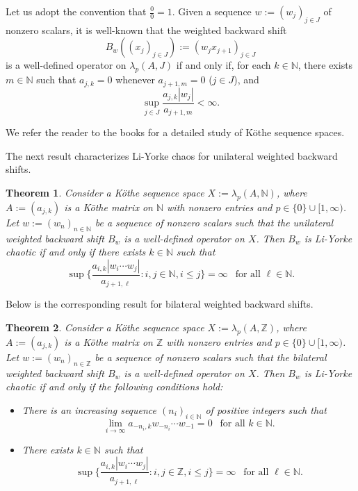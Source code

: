 \documentclass[12pt]{amsart}
\theoremstyle{theorem}
\newtheorem{theorem}{Theorem}%
\theoremstyle{definition}
\theoremstyle{remark} \theoremstyle{question} \theoremstyle{example}
\newcommand{\N}{\mathbb{N}}
\newcommand{\Z}{\mathbb{Z}}
\begin{document}
Let us adopt the convention that $\frac{0}{0} = 1$.
Given a sequence $w\!:= (w_j)_{j \in J}$ of nonzero scalars, it is well-known that the weighted backward shift
\[
B_w((x_j)_{j \in J})\!:= (w_j x_{j+1})_{j \in J}
\]
is a well-defined operator on $\lambda_p(A,J)$ if and only if, for each $k \in \N$, there exists $m \in \N$ such that
$a_{j,k} = 0$ whenever $a_{j+1,m} = 0$ ($j \in J$), and  
\begin{equation}\label{Kothe-Eq1}
\sup_{j \in J} \frac{a_{j,k} |w_j|}{a_{j+1,m}} < \infty.
\end{equation}

We refer the reader to the books \cite{GKot69,RMeiDVog97} for a detailed study of K\"othe sequence spaces.

The next result characterizes Li-Yorke chaos for unilateral weighted backward shifts.

\begin{theorem}\label{Kothe-LY-T1}
Consider a K\"othe sequence space $X\!:= \lambda_p(A,\N)$, 
where $A\!:= (a_{j,k})$ is a K\"othe matrix on $\N$ with nonzero entries and $p \in \{0\} \cup [1,\infty)$. 
Let $w\!:= (w_n)_{n \in \N}$ be a sequence of nonzero scalars such that 
the unilateral weighted backward shift $B_w$ is a well-defined operator on $X$.
Then $B_w$ is Li-Yorke chaotic if and only if there exists $k \in \N$ such that
\[
\sup\Big\{\frac{a_{i,k} |w_i \cdots w_j|}{a_{j+1,\ell}} : i,j \in \N, i \leq j\Big\} = \infty \ \ \text{ for all } \ell \in \N.
\]
\end{theorem}

Below is the corresponding result for bilateral weighted backward shifts.

\begin{theorem}\label{Kothe-LY-T2}
Consider a K\"othe sequence space $X\!:= \lambda_p(A,\Z)$, 
where $A\!:= (a_{j,k})$ is a K\"othe matrix on $\Z$ with nonzero entries and $p \in \{0\} \cup [1,\infty)$. 
Let $w\!:= (w_n)_{n \in \Z}$ be a sequence of nonzero scalars such that 
the bilateral weighted backward shift $B_w$ is a well-defined operator on $X$.
Then $B_w$ is Li-Yorke chaotic if and only if the following conditions hold: 
\begin{itemize}
\item [\rm (a)] There is an increasing sequence $(n_i)_{i \in \N}$ of positive integers such that
  \[
  \lim_{i \to \infty} a_{-n_i,k} w_{-n_i} \cdots w_{-1} = 0 \ \ \text{ for all } k \in \N.
  \]
\item [\rm (b)] There exists $k \in \N$ such that
  \[
  \sup\Big\{\frac{a_{i,k} |w_i \cdots w_j|}{a_{j+1,\ell}} : i,j \in \Z, i \leq j\Big\} = \infty \ \ \text{ for all } \ell \in \N.
  \]
\end{itemize}
\end{theorem}
\end{document}
